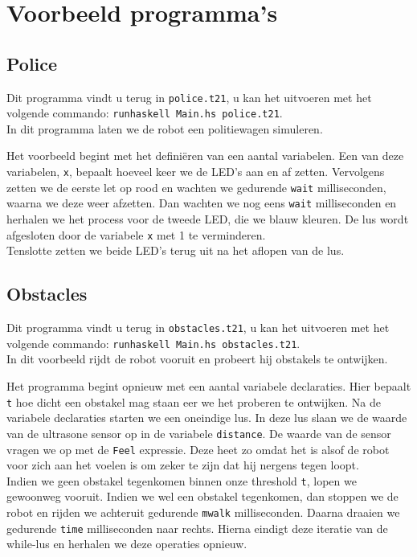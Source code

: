 \documentclass[a4paper]{article}
\begin{document}
\section{Voorbeeld programma's}
\subsection*{Police}
Dit programma vindt u terug in \verb|police.t21|, u kan het uitvoeren met het volgende commando: \verb|runhaskell Main.hs police.t21|.\\
In dit programma laten we de robot een politiewagen simuleren.

\par Het voorbeeld begint met het defini\"eren van een aantal variabelen. Een van deze variabelen, \verb|x|, bepaalt hoeveel keer we de LED's aan en af zetten. Vervolgens zetten we de eerste let op rood en wachten we gedurende \verb|wait| milliseconden, waarna we deze weer afzetten. Dan wachten we nog eens \verb|wait| milliseconden en herhalen we het process voor de tweede LED, die we blauw kleuren. De lus wordt afgesloten door de variabele \verb|x| met 1 te verminderen.\\
Tenslotte zetten we beide LED's terug uit na het aflopen van de lus.

\subsection*{Obstacles}
Dit programma vindt u terug in \verb|obstacles.t21|, u kan het uitvoeren met het volgende commando: \verb|runhaskell Main.hs obstacles.t21|.\\
In dit voorbeeld rijdt de robot vooruit en probeert hij obstakels te ontwijken.

\par Het programma begint opnieuw met een aantal variabele declaraties. Hier bepaalt \verb|t| hoe dicht een obstakel mag staan eer we het proberen te ontwijken. Na de variabele declaraties starten we een oneindige lus. In deze lus slaan we de waarde van de ultrasone sensor op in de variabele \verb|distance|. De waarde van de sensor vragen we op met de \verb|Feel| expressie. Deze heet zo omdat het is alsof de robot voor zich aan het voelen is om zeker te zijn dat hij nergens tegen loopt.\\
Indien we geen obstakel tegenkomen binnen onze threshold \verb|t|, lopen we gewoonweg vooruit. Indien we wel een obstakel tegenkomen, dan stoppen we de robot en rijden we achteruit gedurende \verb|mwalk| milliseconden. Daarna draaien we gedurende \verb|time| milliseconden naar rechts. Hierna eindigt deze iteratie van de while-lus en herhalen we deze operaties opnieuw.
\end{document}
